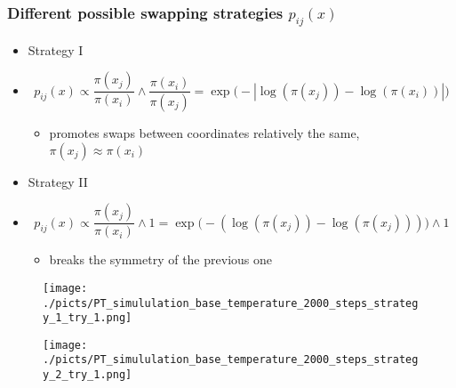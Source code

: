 
\begin{frame}
		\frametitle{ Different possible swapping strategies $p_{ij}( x )$ }

	\begin{itemize}
		\item[] Strategy I 
		\item[] 
	$$p_{ij}(x) \propto \frac{\pi (x_j)}{\pi( x_i )} \wedge \frac{\pi (x_i)}{\pi( x_j )} = \exp \Big( - | \log ( \pi(x_j) ) - \log ( \pi(x_i) ) | \Big)$$
		\begin{itemize}		
 			\item promotes swaps between coordinates relatively the same,  $\pi (x_j) \approx \pi (x_i)$ 
		\end{itemize}
	
		\item[] Strategy II 
		\item[] 
	$$p_{ij}(x) \propto \frac{\pi (x_j)}{\pi (x_i)} \wedge 1 = \exp \Big( - ( \log ( \pi(x_j) ) - \log ( \pi(x_j) ) )\Big) \wedge 1$$
		\begin{itemize}		
 			\item breaks the symmetry of the previous one
		\end{itemize}

	\end{itemize}

\end{frame}

\begin{frame}[plain]

	\begin{center}
		\begin{figure}\texttt{[image: ./picts/PT\_simululation\_base\_temperature\_2000\_steps\_strategy\_1\_try\_1.png]}\end{figure}	
	\end{center}	
		
\end{frame}


\begin{frame}[plain]

	\begin{center}
		\begin{figure}\texttt{[image: ./picts/PT\_simululation\_base\_temperature\_2000\_steps\_strategy\_2\_try\_1.png]}\end{figure}	
	\end{center}	
		
\end{frame}


